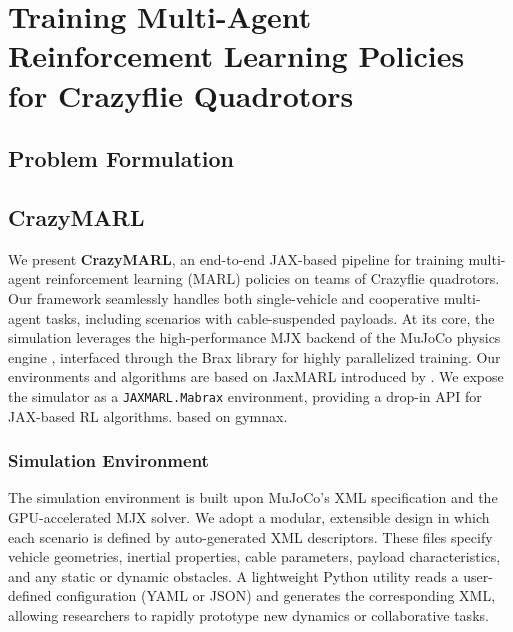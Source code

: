 \chapter{Training Multi-Agent Reinforcement Learning Policies for Crazyflie Quadrotors}


\section{Problem Formulation}


\section{CrazyMARL}
We present \textbf{CrazyMARL}, an end-to-end JAX-based pipeline for training multi-agent reinforcement learning (MARL) policies on teams of Crazyflie quadrotors. Our framework seamlessly handles both single-vehicle and cooperative multi-agent tasks, including scenarios with cable-suspended payloads. At its core, the simulation leverages the high-performance MJX backend of the MuJoCo physics engine \cite{todorov_mujoco_2012}, interfaced through the Brax library for highly parallelized training. Our environments and algorithms are based on JaxMARL introduced by \autocite{flair2023jaxmarl}. We expose the simulator as a \texttt{JAXMARL.Mabrax} environment, providing a drop-in API for JAX-based RL algorithms.
\autocite{gymnax2022github} based on gymnax.
\subsection{Simulation Environment}
The simulation environment is built upon MuJoCo's XML specification and the GPU-accelerated MJX solver. We adopt a modular, extensible design in which each scenario is defined by auto-generated XML descriptors. These files specify vehicle geometries, inertial properties, cable parameters, payload characteristics, and any static or dynamic obstacles. A lightweight Python utility reads a user-defined configuration (YAML or JSON) and generates the corresponding XML, allowing researchers to rapidly prototype new dynamics or collaborative tasks. 
